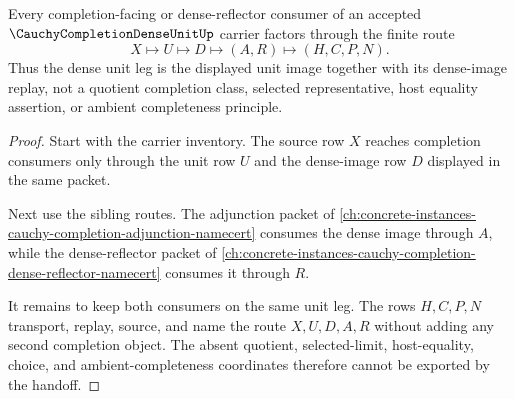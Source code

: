 \begin{theorem}
\label{thm:cauchy-completion-dense-unit-density-handoff}
Every completion-facing or dense-reflector consumer of an accepted $\CauchyCompletionDenseUnitUp$ carrier factors through the finite route
$$
X\longmapsto U\longmapsto D\longmapsto(A,R)\longmapsto(H,C,P,N).
$$
Thus the dense unit leg is the displayed unit image together with its dense-image replay, not a quotient completion class, selected representative, host equality assertion, or ambient completeness principle.
\end{theorem}
\begin{proof}
Start with the carrier inventory. The source row $X$ reaches completion consumers only through the unit row $U$ and the dense-image row $D$ displayed in the same packet.

Next use the sibling routes. The adjunction packet of \autoref{ch:concrete-instances-cauchy-completion-adjunction-namecert} consumes the dense image through $A$, while the dense-reflector packet of \autoref{ch:concrete-instances-cauchy-completion-dense-reflector-namecert} consumes it through $R$.

It remains to keep both consumers on the same unit leg. The rows $H,C,P,N$ transport, replay, source, and name the route $X,U,D,A,R$ without adding any second completion object. The absent quotient, selected-limit, host-equality, choice, and ambient-completeness coordinates therefore cannot be exported by the handoff.
\end{proof}


\begin{closurestatus}{\CauchyCompletionDenseUnitUp}
  \theoryclosure{\seedClosure}
  \formalstatus{\formalTargetV}
\end{closurestatus}
